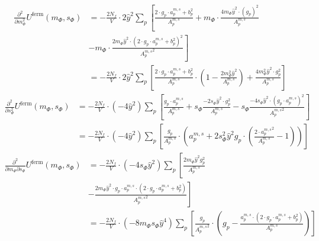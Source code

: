 \begin{align}\label{eq:CEP_derivative_dmdm_fermionicContribution}        
 \frac{\partial^2 }{\partial m_{\Phi}^2} U^{\text{ferm}}(m_{\Phi}, s_{\Phi}) &= -\frac{2N_f}{V} \cdot 2 \hat y^2 \sum\limits_p
                   \left[ \frac{2 \cdot g_p \cdot {a_p^{m,s}} + b_p^2}{ {A_p^{m, s}} } 
                   + m_{\Phi} \cdot \frac{   4 m_{\Phi} \hat y^2 \cdot  \left(g_p\right)^2    }{{A_p^{m, s}} } \right.
       \nonumber  \\
%                    
                  &- \left. m_{\Phi} \cdot \frac{ 2 m_{\Phi} \hat y^2 \cdot \left(2 \cdot g_p \cdot {a_p^{m,s}} + b_p^2 \right)^2 }
                    { {A_p^{m, s}}^2 } \right]
       \nonumber \\
%                     
             &= -\frac{2N_f}{V} \cdot 2 \hat y^2 \sum\limits_p 
                \left[ \frac{  2 \cdot g_p \cdot {a_p^{m,s}} + b_p^2   }{ {A_p^{m, s}} } 
                  \cdot \left( 1 - \frac{2m_{\Phi}^2 \hat y ^2}{ {A_p^{m, s}} }  \right) 
                  + \frac{   4 m_{\Phi}^2 \hat y ^2 \cdot g_p^2    }{{A_p^{m, s}} }\right]
\end{align} 
\begin{align} \label{eq:CEP_derivative_dsds_fermionicContribution}
 \frac{\partial^2 }{\partial s_{\Phi}^2} U^{\text{ferm}}(m_{\Phi}, s_{\Phi}) &= -\frac{2N_f}{V} \cdot (-4 \hat y^2) \sum\limits_p
                \left[ \frac{g_p \cdot {a_p^{m,s}} }{ {A_p^{m, s}} } 
                + s_{\Phi} \frac{ -2 s_{\Phi} \hat y^2 \cdot g_p^2}{ {A_p^{m, s}} }
                - s_{\Phi} \frac{ -4 s_{\Phi} \hat y^2 \cdot \left( g_p \cdot {a_p^{m,s}} \right)^2 }{ {A_p^{m, s}}^2 } \right]
      \nonumber \\
               &= -\frac{2N_f}{V} \cdot (-4 \hat y^2) \sum\limits_p 
                  \left[ \frac{g_p}{ {A_p^{m, s}} }\cdot \left( {a_p^{m,s}} + 2 s_{\Phi}^2 \hat y ^2 g_p 
                  \cdot \left( \frac{ 2 \cdot {a_p^{m,s}}^2}{  {A_p^{m, s}} } - 1 \right) \right) \right]
\end{align}
\begin{align} \label{eq:CEP_derivative_dmds_fermionicContribution}
 \frac{\partial^2 }{\partial m_{\Phi} \partial s_{\Phi}} U^{\text{ferm}}(m_{\Phi}, s_{\Phi}) &= -\frac{2N_f}{V} \cdot (-4 s_{\Phi}\hat y^2) \sum\limits_p
                   \left[ \frac{ 2 m_{\Phi} \hat y^2 g_p^2}{ {A_p^{m, s}} } \right. 
      \nonumber \\
                 & -\left. \frac{ 2 m_{\Phi} \hat y^2 \cdot g_p \cdot {a_p^{m,s}} \cdot \left( 2 \cdot g_p\cdot {a_p^{m,s}} + b_p^2 \right)}
                     { {A_p^{m, s}}^2 } \right] 
      \nonumber \\
                &= -\frac{2N_f}{V} \cdot (-8 m_{\Phi} s_{\Phi}\hat y^4) \sum\limits_p 
                    \left[ \frac{g_p}{ {A_p^{m, s}}^2 } \cdot \left( g_p  
                    - \frac{ {a_p^{m,s}} \cdot \left( 2 \cdot g_p\cdot {a_p^{m,s}} + b_p^2 \right)}
                     { {A_p^{m, s}} }\right) \right] 
\end{align}

